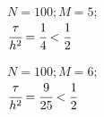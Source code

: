 \documentclass[12pt]{extarticle}
\numberwithin{equation}{section}
\begin{document}
\begin{figure}[H]
\end{figure}\begin{figure}[H]
\begin{minipage}[h]{0.43\linewidth}
 $N=100; M=5;$\\$\cfrac{\tau}{h^2} = \cfrac{1}{4} < \cfrac{1}{2}$ \\
\end{minipage}
\hfill
\begin{minipage}[h]{0.43\linewidth}
 $N=100; M=6;$\\$ \cfrac{\tau}{h^2} = \cfrac{9}{25} < \cfrac{1}{2}$
\end{minipage}
\end{figure}
\end{document}

